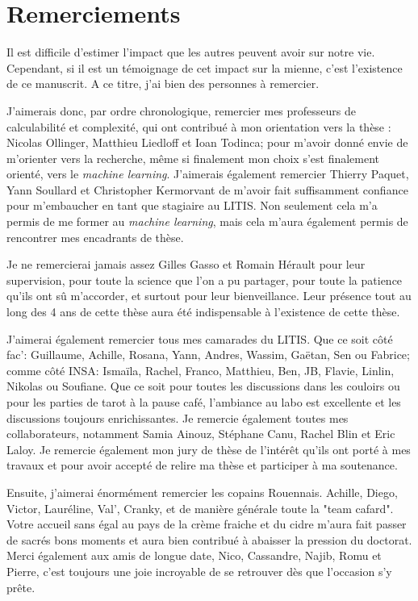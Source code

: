 \chapter*{Remerciements}
\label{chap:remerciements}

Il est difficile d'estimer l'impact que les autres peuvent avoir sur notre vie. Cependant, si il est un témoignage de cet impact sur la mienne, c'est l'existence de ce manuscrit. A ce titre, j'ai bien des personnes à remercier.

J'aimerais donc, par ordre chronologique, remercier mes professeurs de calculabilité et complexité, qui ont contribué à mon orientation vers la thèse : Nicolas Ollinger, Matthieu Liedloff et Ioan Todinca; pour m'avoir donné envie de m'orienter vers la recherche, même si finalement mon choix s'est finalement orienté, vers le \textit{machine learning}. J'aimerais également remercier Thierry Paquet, Yann Soullard et Christopher Kermorvant de m'avoir fait suffisamment confiance pour m'embaucher en tant que stagiaire au LITIS. Non seulement cela m'a permis de me former au \textit{machine learning}, mais cela m'aura également permis de rencontrer mes encadrants de thèse.

Je ne remercierai jamais assez Gilles Gasso et Romain Hérault pour leur supervision, pour toute la science que l'on a pu partager, pour toute la patience qu'ils ont sû m'accorder, et surtout pour leur bienveillance. Leur présence tout au long des 4 ans de cette thèse aura été indispensable à l'existence de cette thèse.

J'aimerai également remercier tous mes camarades du LITIS. Que ce soit côté fac': Guillaume, Achille, Rosana, Yann, Andres, Wassim, Gaëtan, Sen ou Fabrice; comme côté INSA: Ismaïla, Rachel,  Franco, Matthieu, Ben, JB, Flavie, Linlin, Nikolas ou Soufiane. Que ce soit pour toutes les discussions dans les couloirs ou pour les parties de tarot à la pause café, l'ambiance au labo est excellente et les discussions toujours enrichissantes. Je remercie également toutes mes collaborateurs, notamment Samia Ainouz, Stéphane Canu, Rachel Blin et Eric Laloy. Je remercie également mon jury de thèse de l'intérêt qu'ils ont porté à mes travaux et pour avoir accepté de relire ma thèse et participer à ma soutenance.

Ensuite, j'aimerai énormément remercier les copains Rouennais. Achille, Diego, Victor, Lauréline, Val', Cranky, et de manière générale toute la "team cafard". Votre accueil sans égal au pays de la crème fraiche et du cidre m'aura fait passer de sacrés bons moments et aura bien contribué à abaisser la pression du doctorat.  Merci également aux amis de longue date, Nico, Cassandre, Najib, Romu et Pierre, c'est toujours une joie incroyable de se retrouver dès que l'occasion s'y prête.

